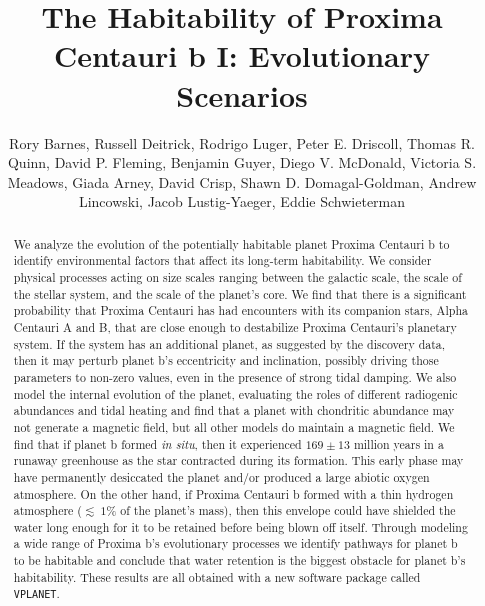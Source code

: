 \documentclass[preprint,12pt]{aastex}
\def\vplanet{\texttt{\footnotesize{VPLANET}}\xspace}
\begin{document}
\title{The Habitability of Proxima Centauri b I: Evolutionary Scenarios}
\author{Rory Barnes, Russell Deitrick, Rodrigo Luger, Peter E. Driscoll, Thomas R. Quinn, David P. Fleming, Benjamin Guyer, Diego V. McDonald, Victoria S. Meadows, Giada Arney, David Crisp, Shawn D. Domagal-Goldman, Andrew Lincowski, Jacob Lustig-Yaeger, Eddie Schwieterman}

\begin{abstract}
We analyze the evolution of the potentially habitable planet Proxima
Centauri b to identify environmental factors that affect its long-term
habitability. We consider physical processes acting on size scales 
ranging between the galactic scale, the scale of the stellar system, 
and the scale of the planet's core.
We find that there is a significant probability that
Proxima Centauri has had encounters with its companion stars, Alpha
Centauri A and B, that are close enough to destabilize Proxima
Centauri's planetary system. If the system has an additional
planet, as suggested by the discovery data, then it may perturb
planet b's eccentricity and inclination, possibly driving those
parameters to non-zero values, even in the presence of strong tidal
damping. We also model the internal evolution of the planet, evaluating
the roles of different radiogenic abundances and tidal heating and
find that a planet with chondritic abundance may not generate a magnetic field, but
all other models do maintain a magnetic field. We
find that if planet b formed {\it in situ}, then it
experienced $169\pm 13$ million years in a runaway greenhouse as the star
contracted during its formation. This early phase may have permanently
desiccated the planet and/or produced a large abiotic
oxygen atmosphere. On the other hand, if Proxima Centauri b formed
with a thin hydrogen atmosphere ($\lesssim~1$\% of the planet's mass), then this envelope could have shielded
the water long enough for it to be retained before being
blown off itself. Through modeling a wide range of Proxima b's evolutionary processes we identify pathways for planet b to be
habitable and conclude that water retention is the biggest obstacle
for planet b's habitability. These results are all obtained with a new
software package called \vplanet.

\end{abstract}
\end{document}
